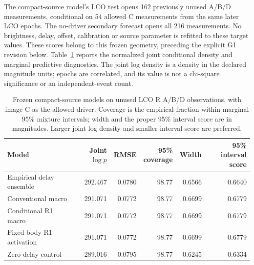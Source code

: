 The compact-source model's LCO test opens 162 previously unused A/B/D measurements, conditional on 54 allowed C measurements from the same later LCO epochs. The no-driver secondary forecast opens all 216 measurements. No brightness, delay, offset, calibration or source parameter is refitted to these target values. These scores belong to this frozen geometry, preceding the explicit G1 revision below.
Table~\ref{tab:he0435-revised-primary} reports the normalized joint conditional density and marginal predictive diagnostics. The joint log density is a density in the declared magnitude units; epochs are correlated, and its value is not a chi-square significance or an independent-event count.
\begin{table}[t]
\caption{Frozen compact-source models on unused LCO R A/B/D observations, with image C as the allowed driver. Coverage is the empirical fraction within marginal 95\% mixture intervals; width and the proper 95\% interval score are in magnitudes. Larger joint log density and smaller interval score are preferred.}\label{tab:he0435-revised-primary}
\centering\footnotesize
\begin{tabular}{lrrrrr}\toprule
Model & Joint $\log p$ & RMSE & \shortstack{95\%\\coverage} & Width & \shortstack{95\%\\interval score}\\\midrule
Empirical delay ensemble & 292.467 & 0.0780 & 98.77 & 0.6566 & 0.6640\\
Conventional macro & 291.071 & 0.0772 & 98.77 & 0.6699 & 0.6779\\
Conditional R1 macro & 291.071 & 0.0772 & 98.77 & 0.6699 & 0.6779\\
Fixed-body R1 activation & 291.071 & 0.0772 & 98.77 & 0.6699 & 0.6779\\
Zero-delay control & 289.016 & 0.0795 & 98.77 & 0.6245 & 0.6334\\
\bottomrule\end{tabular}
\end{table}

